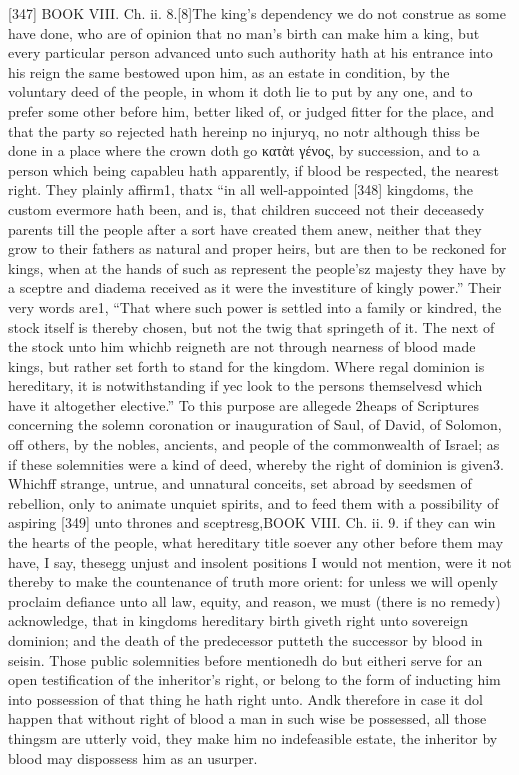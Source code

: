 [347]
BOOK VIII. Ch. ii. 8.[8]The king’s dependency we do not construe as some have done, who are of opinion that no man’s birth can make him a king, but every particular person advanced unto such authority hath at his entrance into his reign the same bestowed upon him, as an estate in condition, by the voluntary deed of the people, in whom it doth lie to put by any one, and to prefer some other before him, better liked of, or judged fitter for the place, and that the party so rejected hath hereinp no injuryq, no notr although thiss be done in a place where the crown doth go κατὰt γένος, by succession, and to a person which being capableu hath apparently, if blood be respected, the nearest right. They plainly affirm1, thatx “in all well-appointed [348] kingdoms, the custom evermore hath been, and is, that children succeed not their deceasedy parents till the people after a sort have created them anew, neither that they grow to their fathers as natural and proper heirs, but are then to be reckoned for kings, when at the hands of such as represent the people’sz majesty they have by a sceptre and diadema received as it were the investiture of kingly power.” Their very words are1, “That where such power is settled into a family or kindred, the stock itself is thereby chosen, but not the twig that springeth of it. The next of the stock unto him whichb reigneth are not through nearness of blood made kings, but rather set forth to stand for the kingdom. Where regal dominion is hereditary, it is notwithstanding if yec look to the persons themselvesd which have it altogether elective.” To this purpose are allegede 2heaps of Scriptures concerning the solemn coronation or inauguration of Saul, of David, of Solomon, off others, by the nobles, ancients, and people of the commonwealth of Israel; as if these solemnities were a kind of deed, whereby the right of dominion is given3. Whichff strange, untrue, and unnatural conceits, set abroad by seedsmen of rebellion, only to animate unquiet spirits, and to feed them with a possibility of aspiring [349] unto thrones and sceptresg,BOOK VIII. Ch. ii. 9. if they can win the hearts of the people, what hereditary title soever any other before them may have, I say, thesegg unjust and insolent positions I would not mention, were it not thereby to make the countenance of truth more orient: for unless we will openly proclaim defiance unto all law, equity, and reason, we must (there is no remedy) acknowledge, that in kingdoms hereditary birth giveth right unto sovereign dominion; and the death of the predecessor putteth the successor by blood in seisin. Those public solemnities before mentionedh do but eitheri serve for an open testification of the inheritor’s right, or belong to the form of inducting him into possession of that thing he hath right unto. Andk therefore in case it dol happen that without right of blood a man in such wise be possessed, all those thingsm are utterly void, they make him no indefeasible estate, the inheritor by blood may dispossess him as an usurper.

